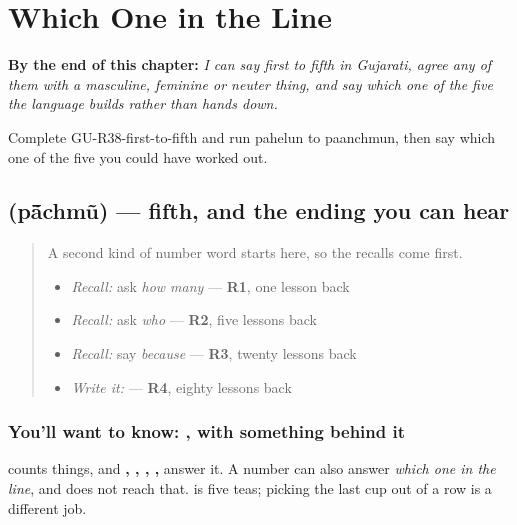 
\chapter{Which One in the Line}
\label{ch:gu-ordinals}

\begin{chapteropening}
\textbf{By the end of this chapter:} \emph{I can say first to fifth in Gujarati, agree any of them with a masculine, feminine or neuter thing, and say which one of the five the language builds rather than hands down.}

Complete GU-R38-first-to-fifth and run pahelun to paanchmun, then say which one of the five you could have worked out.
\end{chapteropening}

\section[\texorpdfstring{\gu{પાંચમું} (pā̃chmũ)}{પાંચમું (pā̃chmũ)}]{ (pā̃chmũ) — fifth, and the ending you can hear}

\label{lesson:GU-C38-panchmu}



\begin{quote}
A second kind of number word starts here, so the recalls come first.

\begin{itemize}
\raggedright
  \item \emph{Recall:} ask \emph{how many} — \textbf{R1}, one lesson back
  \item \emph{Recall:} ask \emph{who} — \textbf{R2}, five lessons back
  \item \emph{Recall:} say \emph{because} — \textbf{R3}, twenty lessons back
  \item \emph{Write it:} \textbf{} — \textbf{R4}, eighty lessons back
\end{itemize}
\end{quote}

\subsection*{You'll want to know: , with something behind it}
\textbf{} counts things, and \textbf{, , , , } answer it. A number can also answer \emph{which one in the line}, and \textbf{} does not reach that. \textbf{ } is five teas; picking the last cup out of a row is a different job.

